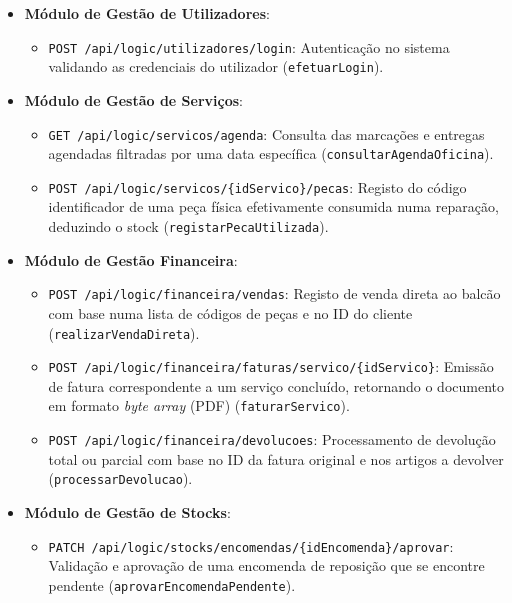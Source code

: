 \documentclass[a4paper,12pt]{scrreprt}
\begin{document}
\begin{itemize}
    \item \textbf{Módulo de Gestão de Utilizadores}:
        \begin{itemize}
            \item \texttt{POST /api/logic/utilizadores/login}: Autenticação no sistema validando as credenciais do utilizador (\texttt{efetuarLogin}).
        \end{itemize}
    \item \textbf{Módulo de Gestão de Serviços}:
        \begin{itemize}
            \item \texttt{GET /api/logic/servicos/agenda}: Consulta das marcações e entregas agendadas filtradas por uma data específica (\texttt{consultarAgendaOficina}).
            \item \texttt{POST /api/logic/servicos/\{idServico\}/pecas}: Registo do código identificador de uma peça física efetivamente consumida numa reparação, deduzindo o stock (\texttt{registarPecaUtilizada}).
        \end{itemize}
    \item \textbf{Módulo de Gestão Financeira}:
        \begin{itemize}
            \item \texttt{POST /api/logic/financeira/vendas}: Registo de venda direta ao balcão com base numa lista de códigos de peças e no ID do cliente (\texttt{realizarVendaDireta}).
            \item \texttt{POST /api/logic/financeira/faturas/servico/\{idServico\}}: Emissão de fatura correspondente a um serviço concluído, retornando o documento em formato \textit{byte array} (PDF) (\texttt{faturarServico}).
            \item \texttt{POST /api/logic/financeira/devolucoes}: Processamento de devolução total ou parcial com base no ID da fatura original e nos artigos a devolver (\texttt{processarDevolucao}).
        \end{itemize}
    \item \textbf{Módulo de Gestão de Stocks}:
        \begin{itemize}
            \item \texttt{PATCH /api/logic/stocks/encomendas/\{idEncomenda\}/aprovar}: Validação e aprovação de uma encomenda de reposição que se encontre pendente (\texttt{aprovarEncomendaPendente}).
        \end{itemize}
\end{itemize}
\end{document}
